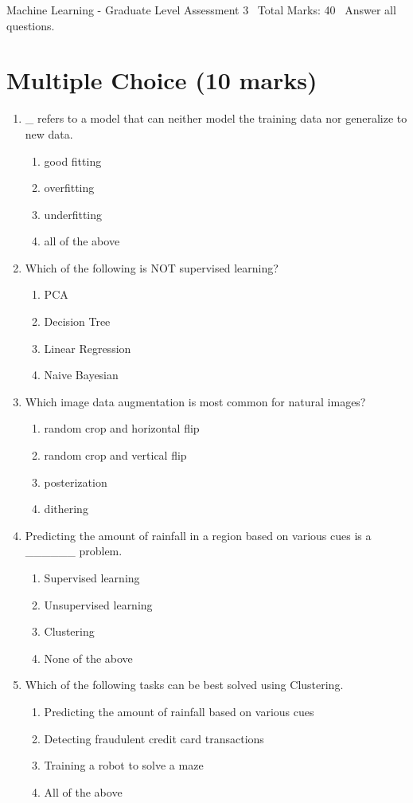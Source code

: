 \documentclass[12pt]{article}
\begin{document}
\begin{center}
Machine Learning - Graduate Level Assessment 3 \
Total Marks: 40 \
Answer all questions.
\end{center}

\section*{Multiple Choice (10 marks)}
\begin{enumerate}[label=\arabic*.]
\item \_ refers to a model that can neither model the training data nor generalize to new data.
\begin{enumerate}[label=(\alph*)]
    \item good fitting
    \item overfitting
    \item underfitting
    \item all of the above
\end{enumerate}
\item Which of the following is NOT supervised learning?
\begin{enumerate}[label=(\alph*)]
    \item PCA
    \item Decision Tree
    \item Linear Regression
    \item Naive Bayesian
\end{enumerate}
\item Which image data augmentation is most common for natural images?
\begin{enumerate}[label=(\alph*)]
    \item random crop and horizontal flip
    \item random crop and vertical flip
    \item posterization
    \item dithering
\end{enumerate}
\item Predicting the amount of rainfall in a region based on various cues is a \_\_\_\_\_\_ problem.
\begin{enumerate}[label=(\alph*)]
    \item Supervised learning
    \item Unsupervised learning
    \item Clustering
    \item None of the above
\end{enumerate}
\item Which of the following tasks can be best solved using Clustering.
\begin{enumerate}[label=(\alph*)]
    \item Predicting the amount of rainfall based on various cues
    \item Detecting fraudulent credit card transactions
    \item Training a robot to solve a maze
    \item All of the above
\end{enumerate}
\end{enumerate}
\end{document}
